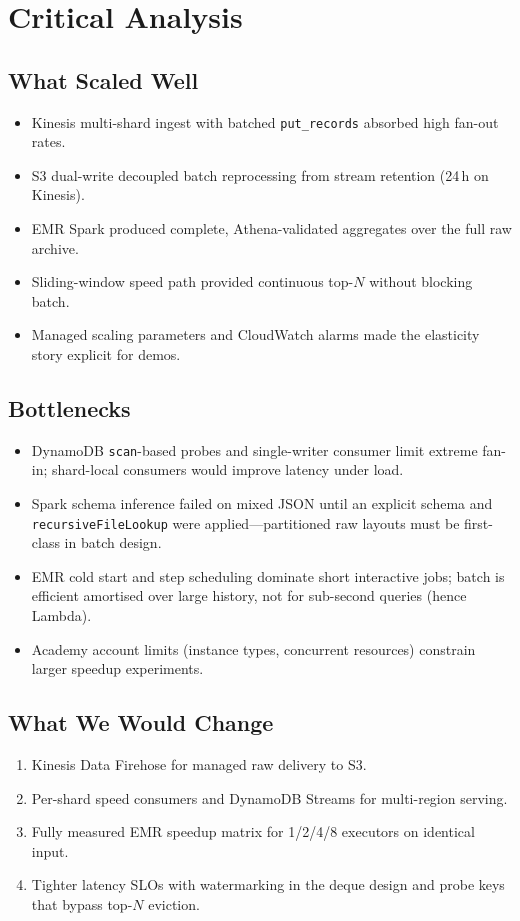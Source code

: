\documentclass[conference]{IEEEtran}
\begin{document}
\section{Critical Analysis}
\subsection{What Scaled Well}
\begin{itemize}
\item Kinesis multi-shard ingest with batched \texttt{put\_records} absorbed high fan-out rates.
\item S3 dual-write decoupled batch reprocessing from stream retention (24\,h on Kinesis).
\item EMR Spark produced complete, Athena-validated aggregates over the full raw archive.
\item Sliding-window speed path provided continuous top-$N$ without blocking batch.
\item Managed scaling parameters and CloudWatch alarms made the elasticity story explicit for demos.
\end{itemize}

\subsection{Bottlenecks}
\begin{itemize}
\item DynamoDB \texttt{scan}-based probes and single-writer consumer limit extreme fan-in; shard-local consumers would improve latency under load.
\item Spark schema inference failed on mixed JSON until an explicit schema and \texttt{recursiveFileLookup} were applied---partitioned raw layouts must be first-class in batch design.
\item EMR cold start and step scheduling dominate short interactive jobs; batch is efficient amortised over large history, not for sub-second queries (hence Lambda).
\item Academy account limits (instance types, concurrent resources) constrain larger speedup experiments.
\end{itemize}

\subsection{What We Would Change}
\begin{enumerate}
\item Kinesis Data Firehose for managed raw delivery to S3.
\item Per-shard speed consumers and DynamoDB Streams for multi-region serving.
\item Fully measured EMR speedup matrix for 1/2/4/8 executors on identical input.
\item Tighter latency SLOs with watermarking in the deque design and probe keys that bypass top-$N$ eviction.
\end{enumerate}
\end{document}
